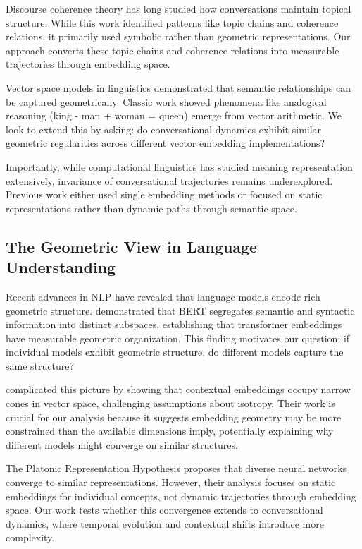 \documentclass[11pt,letterpaper]{article}
\begin{document}
Discourse coherence theory \citep{grosz1995centering, kehler2002coherence} has long studied how conversations maintain topical structure. While this work identified patterns like topic chains and coherence relations, it primarily used symbolic rather than geometric representations. Our approach converts these topic chains and coherence relations into measurable trajectories through embedding space.

Vector space models in linguistics \citep{turney2010frequency, clark2015vector} demonstrated that semantic relationships can be captured geometrically. Classic work showed phenomena like analogical reasoning (king - man + woman = queen) emerge from vector arithmetic. We look to extend this by asking: do conversational dynamics exhibit similar geometric regularities across different vector embedding implementations?

Importantly, while computational linguistics has studied meaning representation extensively, invariance of conversational trajectories remains underexplored. Previous work either used single embedding methods or focused on static representations rather than dynamic paths through semantic space.

\subsection{The Geometric View in Language Understanding}

Recent advances in NLP have revealed that language models encode rich geometric structure. \citet{reif2019visualizing} demonstrated that BERT segregates semantic and syntactic information into distinct subspaces, establishing that transformer embeddings have measurable geometric organization. This finding motivates our question: if individual models exhibit geometric structure, do different models capture the same structure?

\citet{ethayarajh2019contextual} complicated this picture by showing that contextual embeddings occupy narrow cones in vector space, challenging assumptions about isotropy. Their work is crucial for our analysis because it suggests embedding geometry may be more constrained than the available dimensions imply, potentially explaining why different models might converge on similar structures.

The Platonic Representation Hypothesis \citep{huh2024platonic} proposes that diverse neural networks converge to similar representations. However, their analysis focuses on static embeddings for individual concepts, not dynamic trajectories through embedding space. Our work tests whether this convergence extends to conversational dynamics, where temporal evolution and contextual shifts introduce more complexity.
\end{document}
